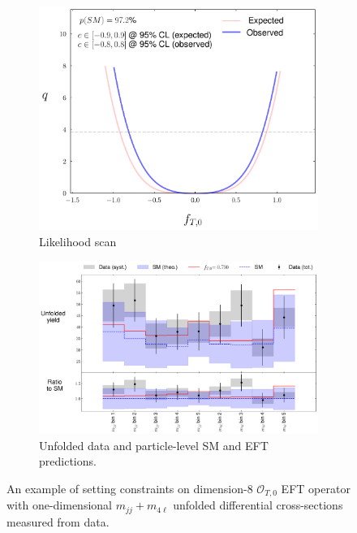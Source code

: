 \begin{figure}[!htbp]
    \centering
    \begin{subfigure}{.49\textwidth}
        \centering
        \includegraphics[width=.8\linewidth]{figures/Results/EFT/Likelihood_profile_FT0_mjj_m4l_SM_fixed_twoobs.pdf}
        \caption{ Likelihood scan \label{fig:EFT_Example_LikelihoodScan_Data}}
    \end{subfigure}
    \begin{subfigure}{.49\textwidth}
        \centering
        \includegraphics[width=.99\linewidth]{figures/Results/EFT/Unfolded_spectrum_FT0_mjj_m4l_SM_fixed_twoobs.pdf}
        \caption{ Unfolded data and particle-level SM and EFT predictions.\label{fig:EFT_Example_MaxValue_Data} }
    \end{subfigure}
    \caption{ An example of setting constraints on dimension-8 $\mathcal{O}_{T,0}$ EFT operator with one-dimensional $m_{jj}+m_{4\ell}$ unfolded differential cross-sections measured from data.  \label{fig:EFT_Example_Data}}
\end{figure}

